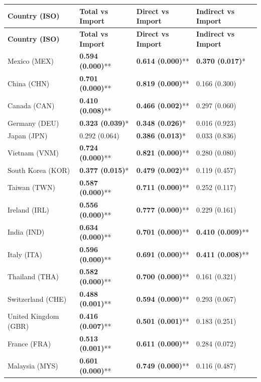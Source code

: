 \begin{longtable}{p{4cm}p{3cm}p{3cm}p{3cm}}
\toprule
\textbf{Country (ISO)} & \textbf{Total vs Import} & \textbf{Direct vs Import} & \textbf{Indirect vs Import} \\
\midrule
\endfirsthead

\toprule
\textbf{Country (ISO)} & \textbf{Total vs Import} & \textbf{Direct vs Import} & \textbf{Indirect vs Import} \\
\midrule
\endhead

\bottomrule
\endfoot

\bottomrule
\endlastfoot

Mexico (MEX) & \textbf{0.594 (0.000)}** & \textbf{0.614 (0.000)}** & \textbf{0.370 (0.017)}* \\
China (CHN) & \textbf{0.701 (0.000)}** & \textbf{0.819 (0.000)}** & 0.166 (0.300) \\
Canada (CAN) & \textbf{0.410 (0.008)}** & \textbf{0.466 (0.002)}** & 0.297 (0.060) \\
Germany (DEU) & \textbf{0.323 (0.039)}* & \textbf{0.348 (0.026)}* & 0.016 (0.923) \\
Japan (JPN) & 0.292 (0.064) & \textbf{0.386 (0.013)}* & 0.033 (0.836) \\
Vietnam (VNM) & \textbf{0.724 (0.000)}** & \textbf{0.821 (0.000)}** & 0.280 (0.080) \\
South Korea (KOR) & \textbf{0.377 (0.015)}* & \textbf{0.479 (0.002)}** & 0.119 (0.457) \\
Taiwan (TWN) & \textbf{0.587 (0.000)}** & \textbf{0.711 (0.000)}** & 0.252 (0.117) \\
Ireland (IRL) & \textbf{0.556 (0.000)}** & \textbf{0.777 (0.000)}** & 0.229 (0.161) \\
India (IND) & \textbf{0.634 (0.000)}** & \textbf{0.701 (0.000)}** & \textbf{0.410 (0.009)}** \\
Italy (ITA) & \textbf{0.596 (0.000)}** & \textbf{0.691 (0.000)}** & \textbf{0.411 (0.008)}** \\
Thailand (THA) & \textbf{0.582 (0.000)}** & \textbf{0.700 (0.000)}** & 0.161 (0.321) \\
Switzerland (CHE) & \textbf{0.488 (0.001)}** & \textbf{0.594 (0.000)}** & 0.293 (0.067) \\
United Kingdom (GBR) & \textbf{0.416 (0.007)}** & \textbf{0.501 (0.001)}** & 0.183 (0.251) \\
France (FRA) & \textbf{0.513 (0.001)}** & \textbf{0.611 (0.000)}** & 0.284 (0.072) \\
Malaysia (MYS) & \textbf{0.601 (0.000)}** & \textbf{0.749 (0.000)}** & 0.116 (0.487) \\

\end{longtable}
